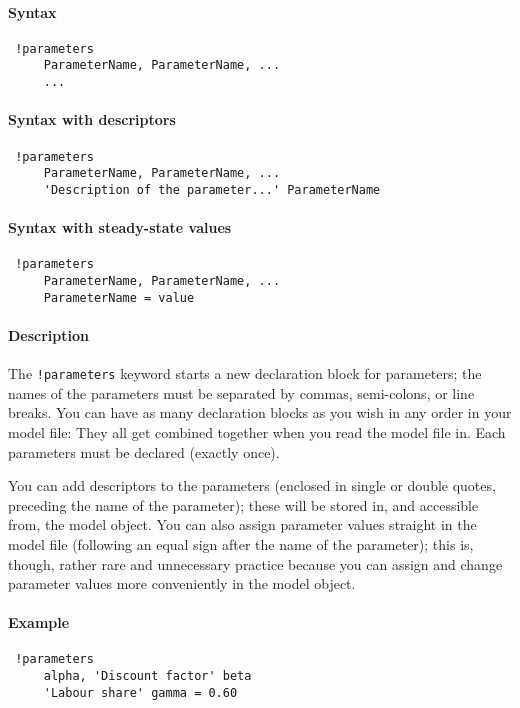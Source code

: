 


	\paragraph{Syntax}
 
 \begin{verbatim}
 !parameters
     ParameterName, ParameterName, ...
     ...
 \end{verbatim}
 
 \paragraph{Syntax with descriptors}
 
 \begin{verbatim}
 !parameters
     ParameterName, ParameterName, ...
     'Description of the parameter...' ParameterName
 \end{verbatim}
 
 \paragraph{Syntax with steady-state values}
 
 \begin{verbatim}
 !parameters
     ParameterName, ParameterName, ...
     ParameterName = value
 \end{verbatim}
 
 \paragraph{Description}
 
 The \texttt{!parameters} keyword starts a new declaration block for
 parameters; the names of the parameters must be separated by commas,
 semi-colons, or line breaks. You can have as many declaration blocks as
 you wish in any order in your model file: They all get combined together
 when you read the model file in. Each parameters must be declared
 (exactly once).
 
 You can add descriptors to the parameters (enclosed in single or double
 quotes, preceding the name of the parameter); these will be stored in,
 and accessible from, the model object. You can also assign parameter
 values straight in the model file (following an equal sign after the
 name of the parameter); this is, though, rather rare and unnecessary
 practice because you can assign and change parameter values more
 conveniently in the model object.
 
 \paragraph{Example}
 
 \begin{verbatim}
 !parameters
     alpha, 'Discount factor' beta
     'Labour share' gamma = 0.60
 \end{verbatim}



